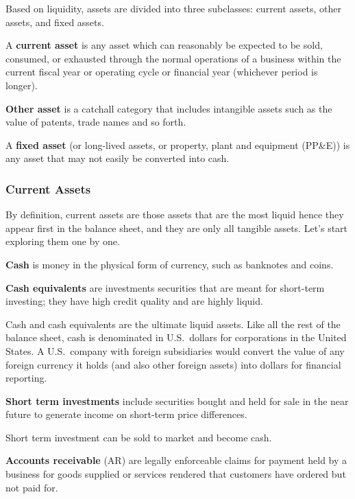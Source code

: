 Based on liquidity, assets are divided into three subclasses: current assets, other assets, and fixed assets.

A \textbf{current asset} is any asset which can reasonably be expected to be sold, consumed, or exhausted through the
normal operations of a business within the current fiscal year or operating cycle or financial year (whichever period is
longer).
\ed

\textbf{Other asset} is a catchall category that includes intangible assets such as the value of patents, trade names
and so forth.
\ed

A \textbf{fixed asset} (or long-lived assets, or property, plant and equipment (PP\&E)) is any asset that may not
easily be converted into cash.
\ed

\subsubsection{Current Assets}

By definition, current assets are those assets that are the most liquid hence they appear first in the balance sheet,
and they are only all tangible assets. Let's start exploring them one by one.

\bd[Cash]
\textbf{Cash} is money in the physical form of currency, such as banknotes and coins.
\ed

\textbf{Cash equivalents} are investments securities that are meant for short-term investing; they have high credit
quality and are highly liquid.
\ed

Cash and cash equivalents are the ultimate liquid assets. Like all the rest of the balance sheet, cash is denominated
in U.S.\ dollars for corporations in the United States. A U.S.\ company with foreign subsidiaries would convert the
value of any foreign currency it holds (and also other foreign assets) into dollars for financial reporting.

\textbf{Short term investments} include securities bought and held for sale in the near future to generate income on
short-term price differences.
\ed

Short term investment can be sold to market and become cash.

\textbf{Accounts receivable} (AR) are legally enforceable claims for payment held by a business for goods supplied or
services rendered that customers have ordered but not paid for.
\ed

